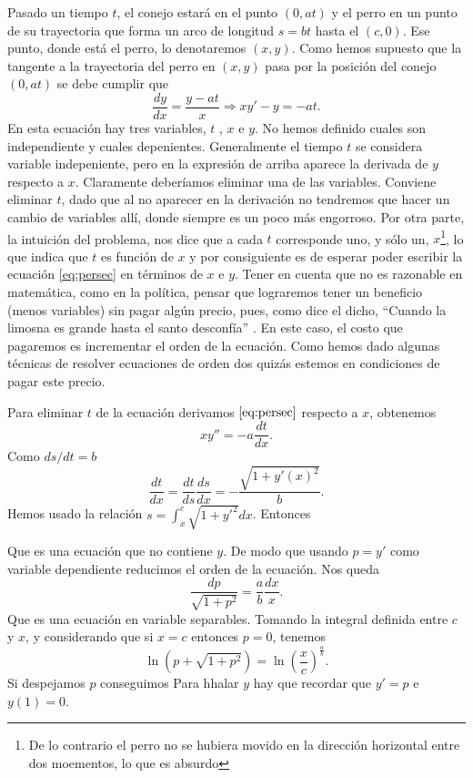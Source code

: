 \documentclass{article}
\begin{document}
Pasado un tiempo $t$, el conejo estará en el punto $(0,at)$ y el perro en un punto de su trayectoria que forma un arco de
 longitud $s=bt$ hasta el $(c,0)$. Ese punto, donde está el perro, lo denotaremos $(x,y)$. Como hemos supuesto que la tangente a la trayectoria del perro en $(x,y)$ pasa 
 por la posición del conejo $(0,at)$ se debe cumplir que
 \begin{equation}\label{eq:persec}\frac{dy}{dx}=\frac{y-at}{x}\Longrightarrow xy'-y=-at.\end{equation}
 En esta ecuación hay tres variables, $t$ , $x$ e $y$. No hemos definido cuales son independiente y cuales depenientes.   Generalmente el tiempo $t$ se considera  variable  indepeniente, pero en la expresión de arriba aparece la derivada de $y$ respecto a $x$.
 Claramente deberíamos eliminar una de las variables. Conviene eliminar $t$, dado que al no aparecer en la derivación no tendremos que hacer un cambio de variables allí, donde siempre es un poco más engorroso.   Por otra parte, la intuición del problema, nos dice que  a cada $t$ corresponde uno, y sólo un, $x$\footnote{De lo contrario el perro no se hubiera movido en la dirección horizontal entre dos moementos, lo que es absurdo}, lo que indica que $t$ es función de $x$ y por consiguiente es de esperar poder escribir la ecuación \eqref{eq:persec} en términos de $x$ e $y$.   Tener en cuenta que no es  razonable en matemática, como en la política,  pensar que lograremos tener un beneficio (menos variables) sin pagar algún precio, pues, como dice el dicho,
 ``Cuando la limosna es grande hasta el santo desconfía'' .
 En este caso, el costo que pagaremos 
 es incrementar el orden de la ecuación. 
 Como hemos dado algunas técnicas de  resolver ecuaciones de orden dos quizás estemos en condiciones de pagar este precio.
 
Para eliminar $t$ de la ecuación derivamos $\eqref{eq:persec}$ respecto a $x$, obtenemos
\[xy''=-a\frac{dt}{dx}.\]
Como $ds/dt=b$ 
\[\frac{dt}{dx}=\frac{dt}{ds}\frac{ds}{dx}=-\frac{\sqrt{1+y'(x)^2}}{b}.\]
Hemos usado la relación $s=\int_x^c\sqrt{1+y'^2}dx$.
 Entonces 

Que es una ecuación que no contiene $y$. De modo que usando $p=y'$ como variable dependiente reducimos el orden de la ecuación. Nos queda
\[\frac{dp}{\sqrt{1+p^2}}=\frac{a}{b}\frac{dx}{x}.\]
Que es una ecuación en variable separables. Tomando la integral definida entre $c$ y $x$, y considerando que si $x=c$ entonces $p=0$, tenemos
\[\ln\left(p+\sqrt{1+p^2}\right)=\ln\left( \frac{x}{c}\right)^{\tfrac{a}{b}}.\]
 Si despejamos $p$ conseguimos
Para hhalar $y$ hay que recordar que $y'=p$ e $y(1)=0$.
\end{document}
